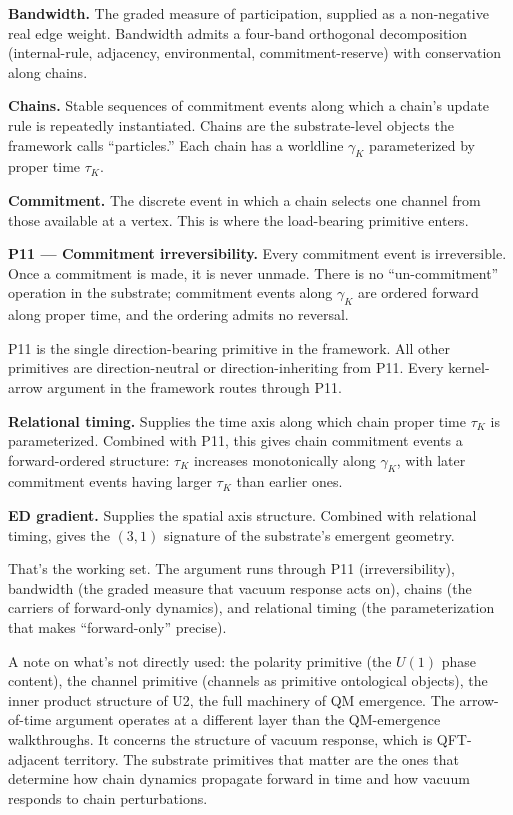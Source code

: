 \documentclass[11pt,a4paper]{article}
\begin{document}
\textbf{Bandwidth.} The graded measure of participation, supplied as a non-negative real edge weight. Bandwidth admits a four-band orthogonal decomposition (internal-rule, adjacency, environmental, commitment-reserve) with conservation along chains.

\textbf{Chains.} Stable sequences of commitment events along which a chain's update rule is repeatedly instantiated. Chains are the substrate-level objects the framework calls ``particles.'' Each chain has a worldline $\gamma_K$ parameterized by proper time $\tau_K$.

\textbf{Commitment.} The discrete event in which a chain selects one channel from those available at a vertex. This is where the load-bearing primitive enters.

\textbf{P11 --- Commitment irreversibility.} Every commitment event is irreversible. Once a commitment is made, it is never unmade. There is no ``un-commitment'' operation in the substrate; commitment events along $\gamma_K$ are ordered forward along proper time, and the ordering admits no reversal.

P11 is the single direction-bearing primitive in the framework. All other primitives are direction-neutral or direction-inheriting from P11. Every kernel-arrow argument in the framework routes through P11.

\textbf{Relational timing.} Supplies the time axis along which chain proper time $\tau_K$ is parameterized. Combined with P11, this gives chain commitment events a forward-ordered structure: $\tau_K$ increases monotonically along $\gamma_K$, with later commitment events having larger $\tau_K$ than earlier ones.

\textbf{ED gradient.} Supplies the spatial axis structure. Combined with relational timing, gives the $(3,1)$ signature of the substrate's emergent geometry.

That's the working set. The argument runs through P11 (irreversibility), bandwidth (the graded measure that vacuum response acts on), chains (the carriers of forward-only dynamics), and relational timing (the parameterization that makes ``forward-only'' precise).

A note on what's not directly used: the polarity primitive (the $U(1)$ phase content), the channel primitive (channels as primitive ontological objects), the inner product structure of U2, the full machinery of QM emergence. The arrow-of-time argument operates at a different layer than the QM-emergence walkthroughs. It concerns the structure of vacuum response, which is QFT-adjacent territory. The substrate primitives that matter are the ones that determine how chain dynamics propagate forward in time and how vacuum responds to chain perturbations.
\end{document}
